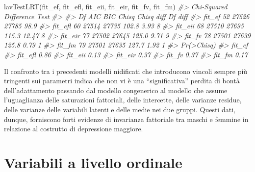 \documentclass[
  11pt,
]{krantz}
\makeatletter
\newenvironment{Shaded}{\begin{snugshade}}{\end{snugshade}}
\newcommand{\CommentTok}[1]{\textcolor[rgb]{0.37,0.37,0.37}{\textit{#1}}}
\newcommand{\FunctionTok}[1]{\textcolor[rgb]{0,0,0}{#1}}
\newcommand{\NormalTok}[1]{#1}
\newenvironment{kframe}{%
\medskip{}
\setlength{\fboxsep}{.8em}
 \def\at@end@of@kframe{}%
 \ifinner\ifhmode%
  \def\at@end@of@kframe{\end{minipage}}%
  \begin{minipage}{\columnwidth}%
 \fi\fi%
 \def\FrameCommand##1{\hskip\@totalleftmargin \hskip-\fboxsep
 \colorbox{shadecolor}{##1}\hskip-\fboxsep
     \hskip-\linewidth \hskip-\@totalleftmargin \hskip\columnwidth}%
 \MakeFramed {\advance\hsize-\width
   \@totalleftmargin\z@ \linewidth\hsize
   \@setminipage}}%
 {\par\unskip\endMakeFramed%
 \at@end@of@kframe}
\renewenvironment{Shaded}{\begin{kframe}}{\end{kframe}}
\theoremstyle{definition}
\theoremstyle{definition}
\theoremstyle{definition}
\theoremstyle{definition}
\theoremstyle{remark}
\makeatother
\begin{document}
\begin{Shaded}
\begin{Highlighting}[]
\FunctionTok{lavTestLRT}\NormalTok{(fit\_ef, fit\_efl, fit\_eii, fit\_eir, fit\_fv, fit\_fm)}
\CommentTok{\#\textgreater{} Chi{-}Squared Difference Test}
\CommentTok{\#\textgreater{} }
\CommentTok{\#\textgreater{}         Df   AIC   BIC Chisq Chisq diff Df diff}
\CommentTok{\#\textgreater{} fit\_ef  52 27526 27785  98.9                   }
\CommentTok{\#\textgreater{} fit\_efl 60 27514 27735 102.8       3.93       8}
\CommentTok{\#\textgreater{} fit\_eii 68 27510 27695 115.3      12.47       8}
\CommentTok{\#\textgreater{} fit\_eir 77 27502 27645 125.0       9.71       9}
\CommentTok{\#\textgreater{} fit\_fv  78 27501 27639 125.8       0.79       1}
\CommentTok{\#\textgreater{} fit\_fm  79 27501 27635 127.7       1.92       1}
\CommentTok{\#\textgreater{}         Pr(\textgreater{}Chisq)}
\CommentTok{\#\textgreater{} fit\_ef            }
\CommentTok{\#\textgreater{} fit\_efl       0.86}
\CommentTok{\#\textgreater{} fit\_eii       0.13}
\CommentTok{\#\textgreater{} fit\_eir       0.37}
\CommentTok{\#\textgreater{} fit\_fv        0.37}
\CommentTok{\#\textgreater{} fit\_fm        0.17}
\end{Highlighting}
\end{Shaded}

Il confronto tra i precedenti modelli nidificati che introducono vincoli sempre più tringenti sui parametri indica che non vi è una ``significativa'' perdita di bontà dell'adattamento passando dal modello congenerico al modello che assume l'uguaglianza delle saturazioni fattoriali, delle intercette, delle varianze residue, delle varianze delle variabili latenti e delle medie nei due gruppi. Questi dati, dunque, forniscono forti evidenze di invarianza fattoriale tra maschi e femmine in relazione al costrutto di depressione maggiore.

\hypertarget{variabili-a-livello-ordinale}{%
\section{Variabili a livello ordinale}\label{variabili-a-livello-ordinale}}
\end{document}
